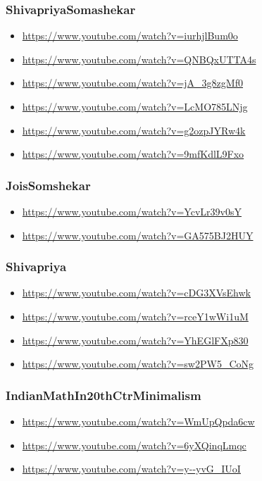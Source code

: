 \subsubsection{ShivapriyaSomashekar}
\label{sec:org1fe1221}
\begin{itemize}
\item \url{https://www.youtube.com/watch?v=iurhjlBum0o}
\item \url{https://www.youtube.com/watch?v=QNBQxUTTA4s}
\item \url{https://www.youtube.com/watch?v=jA\_3g8zgMf0}
\item \url{https://www.youtube.com/watch?v=LcMO785LNjg}
\item \url{https://www.youtube.com/watch?v=g2ozpJYRw4k}
\item \url{https://www.youtube.com/watch?v=9mfKdlL9Fxo}
\end{itemize}

\subsubsection{JoisSomshekar}
\label{sec:orgeffc68c}
\begin{itemize}
\item \url{https://www.youtube.com/watch?v=YcvLr39v0sY}
\item \url{https://www.youtube.com/watch?v=GA575BJ2HUY}
\end{itemize}

\subsubsection{Shivapriya}
\label{sec:org079288c}
\begin{itemize}
\item \url{https://www.youtube.com/watch?v=cDG3XVsEhwk}
\item \url{https://www.youtube.com/watch?v=rceY1wWi1uM}
\item \url{https://www.youtube.com/watch?v=YhEGlFXp830}
\item \url{https://www.youtube.com/watch?v=sw2PW5\_CoNg}
\end{itemize}

\subsubsection{IndianMathIn20thCtrMinimalism}
\label{sec:orged88953}
\begin{itemize}
\item \url{https://www.youtube.com/watch?v=WmUpQpda6cw}
\item \url{https://www.youtube.com/watch?v=6yXQinqLmqc}
\item \url{https://www.youtube.com/watch?v=y--yvG\_IUoI}
\end{itemize}

